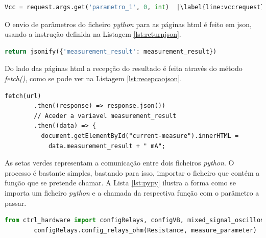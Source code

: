 \begin{minipage}{0.9\linewidth}
	\begin{lstlisting}[language=python, escapechar=|, caption=Recepção de parâmetros, label=lst:metodorequest]
		Vcc = request.args.get('parametro_1', 0, int)  |\label{line:vccrequest}|
	\end{lstlisting}
\end{minipage}

O envio de parâmetros do ficheiro \textit{python} para as páginas \acrshort{html} é feito em \acrfull{json}, usando a instrução definida na Listagem \ref{lst:returnjson}.

\begin{minipage}{0.9\linewidth}
	\begin{lstlisting}[language=python, escapechar=|, caption=Envio de parâmetros \textit{views.py} $\rightarrow$ \acrshort{html}, label=lst:returnjson]
		return jsonify({'measurement_result': measurement_result})
	\end{lstlisting}
\end{minipage}

Do lado das páginas \acrshort{html} a recepção do resultado é feita através do método \textit{fetch()}, como se pode ver na Listagem \ref{lst:recepcaojson}.

\begin{minipage}{0.9\linewidth}
	\begin{lstlisting}[language=html, escapechar=|, caption=Recepção de parâmetros, label=lst:recepcaojson]
		fetch(url)
		.then((response) => response.json())
		// Aceder a variavel measurement_result
		.then((data) => {
		  document.getElementById("current-measure").innerHTML = 
		  	data.measurement_result + " mA";	
		\end{lstlisting}
\end{minipage}

As setas verdes representam a comunicação entre dois ficheiros \textit{python}. O processo é bastante simples, bastando para isso, importar o ficheiro que contém a função que se pretende chamar. A Lista \ref{lst:pypy} ilustra a forma como se importa um ficheiro \textit{python} e a chamada da respectiva função com o parâmetro a passar.

\begin{minipage}{0.9\linewidth}
	\begin{lstlisting}[language=python, escapechar=|, caption=Comunicação \textit{python} - \textit{python}, label=lst:pypy]
		from ctrl_hardware import configRelays, configVB, mixed_signal_oscilloscope |\label{line:ficheiros}|
		configRelays.config_relays_ohm(Resistance, measure_parameter) |\label{line:trueparameter}|
	\end{lstlisting}
\end{minipage}


